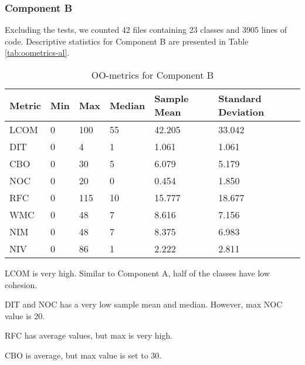 \subsubsection{Component B}
Excluding the tests, we counted 42 files containing 23 classes and 3905 lines of code. Descriptive statistics for Component B are presented in Table \ref{tab:oometrics-al}.
\begin{table}[]
\centering
\caption{OO-metrics for Component B}
\label{tab:oometrics-blc}
\begin{tabular}{|l|l|l|l|l|l|}
\hline
\textbf{Metric} & \textbf{Min} & \textbf{Max} & \textbf{Median} & \textbf{Sample Mean} & \textbf{Standard Deviation} \\ \hline
LCOM            & 0            & 100          & 55              & 42.205               & 33.042                      \\ \hline
DIT             & 0            & 4            & 1               & 1.061                & 1.061                       \\ \hline
CBO             & 0            & 30           & 5               & 6.079                & 5.179                       \\ \hline
NOC             & 0            & 20           & 0               & 0.454                & 1.850                       \\ \hline
RFC             & 0            & 115          & 10              & 15.777               & 18.677                      \\ \hline
WMC             & 0            & 48           & 7               & 8.616                & 7.156                       \\ \hline
NIM             & 0            & 48           & 7               & 8.375                & 6.983                       \\ \hline
NIV             & 0            & 86           & 1               & 2.222                & 2.811                       \\ \hline
\end{tabular}
\end{table}

LCOM is very high. Similar to Component A, half of the classes have low cohesion. 

DIT and NOC has a very low sample mean and median. However, max NOC value is 20.

RFC has average values, but max is very high. 

CBO is average, but max value is set to 30.

